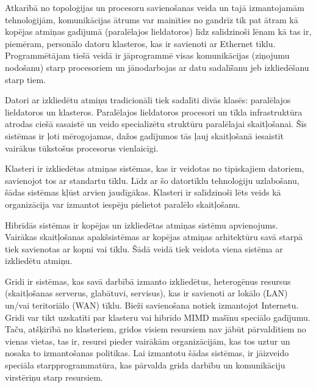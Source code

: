 Atkarībā no topoloģijas un procesoru savienošanas veida un tajā izmantojamām
tehnoloģijām, komunikācijas ātrums var mainīties no gandrīz tik pat ātram kā
kopējas atmiņas gadījumā (paralēlajos lieldatoros) līdz salīdzinoši lēnam kā tas
ir, piemēram, personālo datoru klasteros, kas ir savienoti ar Ethernet tīklu.
Programmētājam tiešā veidā ir jāprogrammē visas komunikācijas (ziņojumu nodošanu)
starp procesoriem un jānodarbojas ar datu sadalīšanu jeb izkliedēšanu starp tiem.

Datori ar izkliedētu atmiņu tradicionāli tiek sadalīti divās klasēs: paralēlajos
lieldatoros un klasteros. Paralēlajos lieldatoros procesori un tīkla infrastruktūra
atrodas ciešā sasaistē un veido specializētu struktūru paralēlajai skaitļošanai.
Šīs sistēmas ir ļoti mērogojamas, dažos gadījumos tās ļauj skaitļošanā iesaistīt
vairākus tūkstošus procesorus vienlaicīgi.

Klasteri ir izkliedētas atmiņas sistēmas, kas ir veidotas no tipiskajiem datoriem,
savienojot tos ar standartu tīklu. Līdz ar šo datortīklu tehnoloģiju uzlabošanu,
šādas sistēmas kļūst arvien jaudīgākas. Klasteri ir salīdzinoši lēts veids kā
organizācija var izmantot iespēju pielietot paralēlo skaitļošanu.

Hibrīdās sistēmas ir kopējas un izkliedētas atmiņas sistēmu apvienojums. Vairākas
skaitļošanas apakšsistēmas ar kopējas atmiņas arhitektūru savā starpā tiek savienotas
ar kopni vai tīklu. Šādā veidā tiek veidota viena sistēma ar izkliedētu atmiņu.

Gridi ir sistēmas, kas savā darbībā izmanto izkliedētus, heterogēnus resursus
(skaitļošanas serverus, glabātuvi, servisus), kas ir savienoti ar lokālo (LAN)
un/vai teritoriālo (WAN) tīklu. Bieži savienošana notiek izmantojot Internetu.
Gridi var tikt uzskatīti par klasteru vai hibrīdo MIMD mašīnu speciālo gadījumu.
Taču, atšķirībā no klasteriem, gridos visiem resursiem nav jābūt pārvaldītiem no
vienas vietas, tas ir, resursi pieder vairākām organizācijām, kas tos uztur un
nosaka to izmantošanas politikas. Lai izmantotu šādas sistēmas, ir jāizveido speciāla
starpprogrammatūra, kas pārvalda grida darbību un komunikāciju virstēriņu starp
resursiem.


